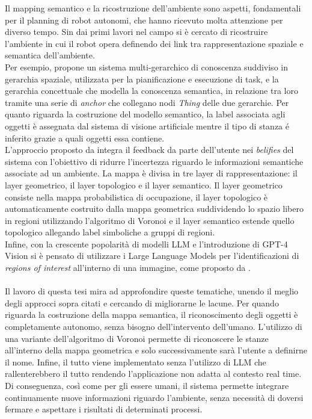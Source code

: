 Il mapping semantico e la ricostruzione dell'ambiente sono aspetti, fondamentali per il planning di robot autonomi, che hanno ricevuto molta attenzione per diverso tempo. Sin dai primi lavori nel campo si è cercato di ricostruire l'ambiente in cui il robot opera definendo dei link tra rappresentazione spaziale e semantica dell'ambiente. \\
Per esempio, \cite{galindo} propone un sistema multi-gerarchico di conoscenza suddiviso in gerarchia spaziale, %
utilizzata per la pianificazione e esecuzione di task, e la gerarchia concettuale che modella la conoscenza semantica, in relazione tra loro tramite una serie di \textit{anchor} che collegano nodi \textit{Thing} delle due gerarchie. Per quanto riguarda la costruzione del modello semantico, la label associata agli oggetti è assegnata dal sistema di visione artificiale mentre il tipo di stanza é inferito grazie a quali oggetti essa contiene.\\
L'approccio proposto da \cite{theobald_godot} integra il feedback da parte dell'utente nei \textit{belifies} del sistema con l'obiettivo di ridurre l'incertezza riguardo le informazioni semantiche associate ad un ambiente. La mappa è divisa in tre layer di rappresentazione: il layer geometrico, il layer topologico e il layer semantico. Il layer geometrico consiste nella mappa probabilistica di occupazione, il layer topologico è automaticamente costruito dalla mappa geometrica suddividendo lo spazio libero in regioni utilizzando l'algoritmo di Voronoi \cite{thrun} e il layer semantico estende quello topologico allegando label simboliche a gruppi di regioni.\\
Infine, con la crescente popolarità di modelli LLM e l'introduzione di GPT-4 Vision si è pensato di utilizzare i Large Language Models per l'identificazioni di \textit{regions of interest} all'interno di una immagine, come proposto da \cite{RunjiaTan}.\\\\
Il lavoro di questa tesi mira ad approfondire queste tematiche, unendo il meglio degli approcci sopra citati e cercando di migliorarne le lacune. Per quando riguarda la costruzione della mappa semantica, il riconoscimento degli oggetti è completamente autonomo, senza bisogno dell'intervento dell'umano. L'utilizzo di una variante dell'algoritmo di Voronoi permette di riconoscere le stanze all'interno della mappa geometrica e solo successivamente sarà l'utente a definirne il nome. Infine, il tutto viene implementato senza l'utilizzo di LLM che rallenterebbero il tutto rendendo l'applicazione non adatta al contesto real time. Di conseguenza, così come per gli essere umani, il sistema permette integrare continuamente nuove informazioni riguardo l'ambiente, senza necessità di doversi fermare e aspettare i risultati di determinati processi.